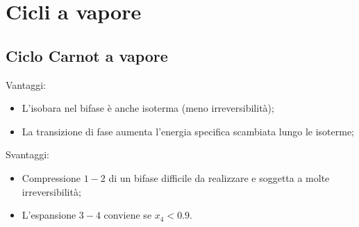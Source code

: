 \section{Cicli a vapore}
\subsection{Ciclo Carnot a vapore}

Vantaggi:
\begin{itemize}
    \item L'isobara nel bifase è anche isoterma (meno irreversibilità);
    \item La transizione di fase aumenta l'energia specifica scambiata lungo le isoterme;
\end{itemize}

Svantaggi:
\begin{itemize}
    \item Compressione $1-2$ di un bifase difficile da realizzare e soggetta a molte irreversibilità;
    \item L'espansione $3-4$ conviene se $x_4<0.9$.
\end{itemize}
